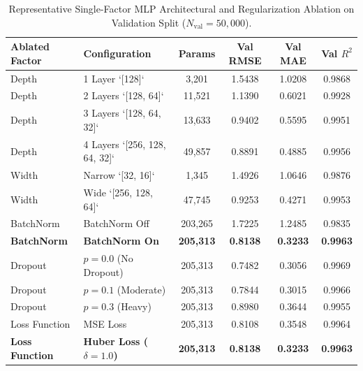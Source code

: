 \documentclass[journal,10pt,twocolumn]{IEEEtran}
\begin{document}
\begin{table}[!t]
\centering
\caption{Representative Single-Factor MLP Architectural and Regularization Ablation on Validation Split ($N_{\text{val}} = 50,000$).}
\label{tab:ablation_dl}
\begin{tabular}{llcccc}
\toprule
\textbf{Ablated Factor} & \textbf{Configuration} & \textbf{Params} & \textbf{Val RMSE} & \textbf{Val MAE} & \textbf{Val $R^2$} \\
\midrule
Depth & 1 Layer `[128]` & 3,201 & 1.5438 & 1.0208 & 0.9868 \\
Depth & 2 Layers `[128, 64]` & 11,521 & 1.1390 & 0.6021 & 0.9928 \\
Depth & 3 Layers `[128, 64, 32]` & 13,633 & 0.9402 & 0.5595 & 0.9951 \\
Depth & 4 Layers `[256, 128, 64, 32]` & 49,857 & 0.8891 & 0.4885 & 0.9956 \\
\midrule
Width & Narrow `[32, 16]` & 1,345 & 1.4926 & 1.0646 & 0.9876 \\
Width & Wide `[256, 128, 64]` & 47,745 & 0.9253 & 0.4271 & 0.9953 \\
\midrule
BatchNorm & BatchNorm Off & 203,265 & 1.7225 & 1.2485 & 0.9835 \\
\textbf{BatchNorm} & \textbf{BatchNorm On} & \textbf{205,313} & \textbf{0.8138} & \textbf{0.3233} & \textbf{0.9963} \\
\midrule
Dropout & $p = 0.0$ (No Dropout) & 205,313 & 0.7482 & 0.3056 & 0.9969 \\
Dropout & $p = 0.1$ (Moderate) & 205,313 & 0.7844 & 0.3015 & 0.9966 \\
Dropout & $p = 0.3$ (Heavy) & 205,313 & 0.8980 & 0.3644 & 0.9955 \\
\midrule
Loss Function & MSE Loss & 205,313 & 0.8108 & 0.3548 & 0.9964 \\
\textbf{Loss Function} & \textbf{Huber Loss ($\delta=1.0$)} & \textbf{205,313} & \textbf{0.8138} & \textbf{0.3233} & \textbf{0.9963} \\
\bottomrule
\end{tabular}
\end{table}
\end{document}
